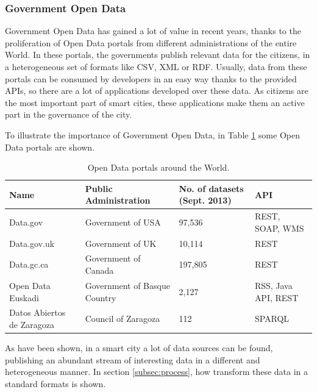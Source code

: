\subsubsection{Government Open Data}

Government Open Data has gained a lot of value in recent years, thanks to the proliferation of Open Data portals from different administrations of the entire World. In these portals, the governments publish relevant data for the citizens, in a heterogeneous set of formats like CSV, XML or RDF. Usually, data from these portals can be consumed by developers in an easy way thanks to the provided APIs, so there are a lot of applications developed over these data. As citizens are the most important part of smart cities, these applications make them an active part in the governance of the city.

To illustrate the importance of Government Open Data, in Table \ref{tab:open data portals} some Open Data portals are shown.

    \begin{table}
        \center
        \begin{tabular}{|p{2cm}|p{3cm}|p{2.5cm}|p{2cm}|}
            \hline
            \textbf{Name} & \textbf{Public Administration} & \textbf{No. of datasets (Sept. 2013)} & \textbf{API} \\
            \hline \hline
            Data.gov & Government of USA & 97,536 & REST, SOAP, WMS\\
            \hline
            Data.gov.uk & Government of UK & 10,114 & REST \\
            \hline
            Data.gc.ca & Government of Canada & 197,805 & REST \\
            \hline
            Open Data Euskadi & Government of Basque Country & 2,127 & RSS, Java API, REST \\
            \hline
            Datos Abiertos de Zaragoza & Council of Zaragoza & 112 & SPARQL \\
            \hline
        \end{tabular}
        \caption{Open Data portals around the World.}
        \label{tab:open data portals}
    \end{table}

As have been shown, in a smart city a lot of data sources can be found, publishing an abundant stream of interesting data in a different and heterogeneous manner. In section \ref{subsec:process}, how transform these data in a standard formats is shown.

